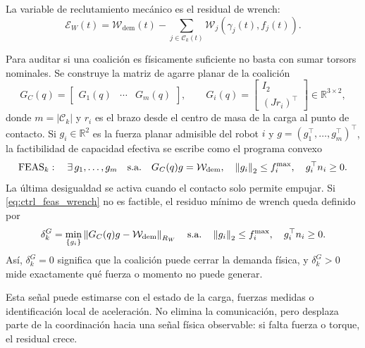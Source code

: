 La variable de reclutamiento mecánico es el residual de wrench:
\begin{equation}
  \mathcal E_W(t)
  =
  \mathcal W_{\mathrm{dem}}(t)
  -
  \sum_{j\in\mathcal C_k(t)}
  \mathcal W_j(\gamma_j(t),f_j(t)).
  \label{eq:ctrl_error_wrench}
\end{equation}

Para auditar si una coalición es físicamente suficiente no basta con sumar torsors
nominales. Se construye la matriz de agarre planar de la coalición
\begin{equation}
  G_C(q)
  =
  \begin{bmatrix}
    G_1(q) & \cdots & G_m(q)
  \end{bmatrix},
  \qquad
  G_i(q)
  =
  \begin{bmatrix}
    I_2\\
    (Jr_i)^\top
  \end{bmatrix}
  \in\mathbb R^{3\times2},
  \label{eq:ctrl_matriz_agarre}
\end{equation}
donde $m=|\mathcal C_k|$ y $r_i$ es el brazo desde el centro de masa de la carga al punto
de contacto. Si $g_i\in\mathbb R^2$ es la fuerza planar admisible del robot $i$ y
$g=(g_1^\top,\ldots,g_m^\top)^\top$, la factibilidad de capacidad efectiva se escribe
como el programa convexo
\begin{equation}
  \operatorname{FEAS}_k:
  \quad
  \exists\,g_1,\ldots,g_m
  \quad
  \text{s.a.}\quad
  G_C(q)g=\mathcal W_{\mathrm{dem}},
  \quad
  \left\|g_i\right\|_2\le f_i^{\max},
  \quad
  g_i^\top n_i\ge0 .
  \label{eq:ctrl_feas_wrench}
\end{equation}
La última desigualdad se activa cuando el contacto solo permite empujar. Si
\eqref{eq:ctrl_feas_wrench} no es factible, el residuo mínimo de wrench queda definido por
\begin{equation}
  \delta_k^{G}
  =
  \min_{\{g_i\}}
  \left\|G_C(q)g-\mathcal W_{\mathrm{dem}}\right\|_{R_W}
  \quad
  \text{s.a.}\quad
  \left\|g_i\right\|_2\le f_i^{\max},
  \quad
  g_i^\top n_i\ge0 .
  \label{eq:ctrl_deficit_wrench_socp}
\end{equation}
Así, $\delta_k^{G}=0$ significa que la coalición puede cerrar la demanda física, y
$\delta_k^{G}>0$ mide exactamente qué fuerza o momento no puede generar.

Esta señal puede estimarse con el estado de la carga, fuerzas medidas o identificación
local de aceleración. No elimina la comunicación, pero desplaza parte de la coordinación
hacia una señal física observable: si falta fuerza o torque, el residual crece.

